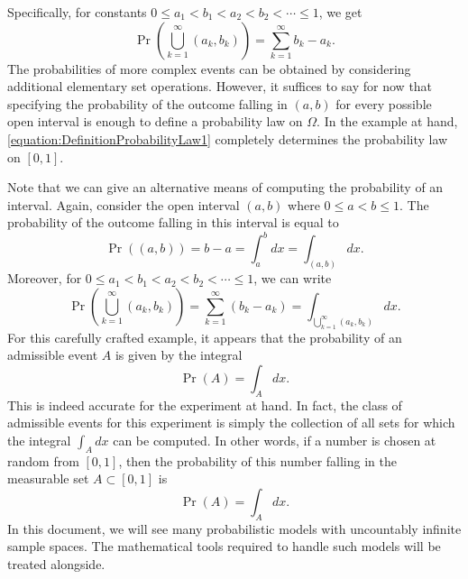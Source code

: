 Specifically, for constants $0 \leq a_1 < b_1 < a_2 < b_2 < \cdots \leq 1$, we get
\begin{equation*}
\Pr \left( \bigcup_{k=1}^{\infty} (a_k,b_k) \right)
= \sum_{k=1}^{\infty} b_k - a_k .
\end{equation*}
The probabilities of more complex events can be obtained by considering additional elementary set operations.
However, it suffices to say for now that specifying the probability of the outcome falling in $(a,b)$ for every possible open interval is enough to define a probability law on $\Omega$.
In the example at hand, \eqref{equation:DefinitionProbabilityLaw1} completely determines the probability law on $[0,1]$.

Note that we can give an alternative means of computing the probability of an interval.
Again, consider the open interval $(a, b)$ where $0 \leq a < b \leq 1$.
The probability of the outcome falling in this  interval is equal to
\begin{equation*}
\Pr ( (a, b) ) = b - a = \int_a^b dx = \int_{(a,b)} dx .
\end{equation*}
Moreover, for $0 \leq a_1 < b_1 < a_2 < b_2 < \cdots \leq 1$, we can write
\begin{equation*}
\Pr \left( \bigcup_{k=1}^{\infty} (a_k,b_k) \right)
= \sum_{k=1}^{\infty} \left( b_k - a_k \right)
= \int_{\bigcup_{k=1}^{\infty} (a_k,b_k)} dx .
\end{equation*}
For this carefully crafted example, it appears that the probability of an admissible event $A$ is given by the integral
\begin{equation*}
\Pr (A) = \int_{A} dx .
\end{equation*}
This is indeed accurate for the experiment at hand.
In fact, the class of admissible events for this experiment is simply the collection of all sets for which the integral $\int_A dx$ can be computed.
In other words, if a number is chosen at random from $[0,1]$, then the probability of this number falling in the measurable set $A \subset [0,1]$ is
\begin{equation*}
\Pr (A) = \int_{A} dx .
\end{equation*}
In this document, we will see many probabilistic models with uncountably infinite sample spaces.
The mathematical tools required to handle such models will be treated alongside.

